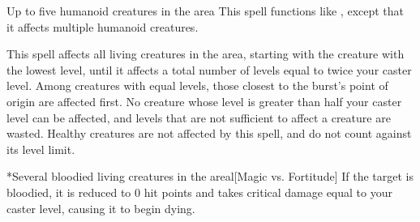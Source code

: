 \begin{spellheader}
\end{spellheader}
\begin{spelleffects}
    \begin{spelltargets}{Up to five humanoid creatures in the area}
        \spellsuccess This spell functions like , except that it affects multiple humanoid creatures.
    \end{spelltargets}
\end{spelleffects}

\begin{spellheader}
\end{spellheader}
\begin{spelleffects}
    \spelleffect This spell affects all \bloodied living creatures in the area, starting with the creature with the lowest level, until it affects a total number of levels equal to twice your caster level. Among creatures with equal levels, those closest to the burst's point of origin are affected first. No creature whose level is greater than half your caster level can be affected, and levels that are not sufficient to affect a creature are wasted. Healthy creatures are not affected by this spell, and do not count against its level limit.
    \begin{spelltargets}*{Several bloodied living creatures in the area}l[Magic vs. Fortitude]
        \spellsuccess If the target is bloodied, it is reduced to 0 hit points and takes critical damage equal to your caster level, causing it to begin dying.
    \end{spelltargets}
    \spellline
\end{spelleffects}

